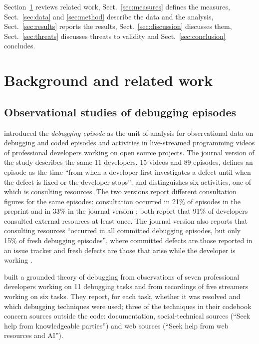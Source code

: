 \documentclass[pdflatex,sn-basic]{sn-jnl}
\begin{document}
Section~\ref{sec:related} reviews related work, Sect.~\ref{sec:measures} defines the measures, Sect.~\ref{sec:data} and \ref{sec:method} describe the data and the analysis, Sect.~\ref{sec:results} reports the results, Sect.~\ref{sec:discussion} discusses them, Sect.~\ref{sec:threats} discusses threats to validity and Sect.~\ref{sec:conclusion} concludes.

\section{Background and related work}\label{sec:related}

\subsection{Observational studies of debugging episodes}

\citet{alaboudi2021} introduced the \emph{debugging episode} as the unit of analysis for observational data on debugging and coded episodes and activities in live-streamed programming videos of professional developers working on open source projects. The journal version of the study \citep{alaboudi2023} describes the same 11 developers, 15 videos and 89 episodes, defines an episode as the time ``from when a developer first investigates a defect until when the defect is fixed or the developer stops'', and distinguishes six activities, one of which is consulting resources. The two versions report different consultation figures for the same episodes: consultation occurred in 21\% of episodes in the preprint \citep{alaboudi2021} and in 33\% in the journal version \citep{alaboudi2023}; both report that 91\% of developers consulted external resources at least once. The journal version also reports that consulting resources ``occurred in all committed debugging episodes, but only 15\% of fresh debugging episodes'', where committed defects are those reported in an issue tracker and fresh defects are those that arise while the developer is working \citep{alaboudi2023}.

\citet{li2026} built a grounded theory of debugging from observations of seven professional developers working on 11 debugging tasks and from recordings of five streamers working on six tasks. They report, for each task, whether it was resolved and which debugging techniques were used; three of the techniques in their codebook concern sources outside the code: documentation, social-technical sources (``Seek help from knowledgeable parties'') and web sources (``Seek help from web resources and AI'').
\end{document}
